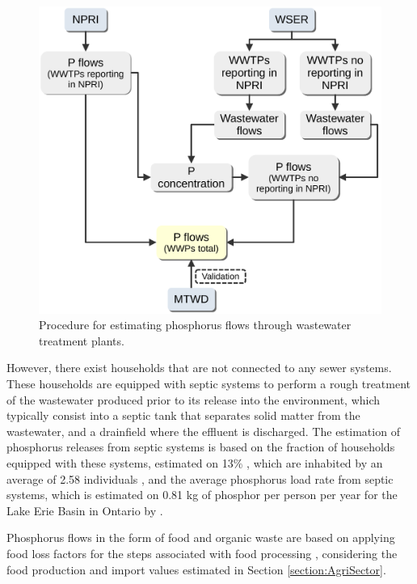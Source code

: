 \documentclass[authoryear]{elsarticle}
\begin{document}

\begin{figure}[H]
	\centering
	\includegraphics[width=0.6\linewidth, trim={0cm 0cm 0cm 0cm},clip]{Figures/FigJorge.pdf} 
	\caption{Procedure for estimating phosphorus flows through wastewater treatment plants.}
	\label{fig:MethodWWTPs}
\end{figure}

However, there exist households that are not connected to any sewer systems. These households are equipped with septic systems to perform a rough treatment of the wastewater produced prior to its release into the environment, which typically consist into a septic tank that separates solid matter from the wastewater, and a drainfield where the effluent is discharged. The estimation of phosphorus releases from septic systems is based on the fraction of households equipped with these systems, estimated on 13\% \citep{CanadaSepticSystems}, which are inhabited by an average of 2.58 individuals \citep{CanadaPersonPerHouse}, and the average phosphorus load rate from septic systems, which is estimated on 0.81 kg of phosphor per person per year for the Lake Erie Basin in Ontario by \citet{oldfield2020estimation}.

Phosphorus flows in the form of food and organic waste are based on applying food loss factors for the steps associated with food processing \citep{FoodLossesFAO}, considering the food production and import values estimated in Section \ref{section:AgriSector}.
\end{document}
